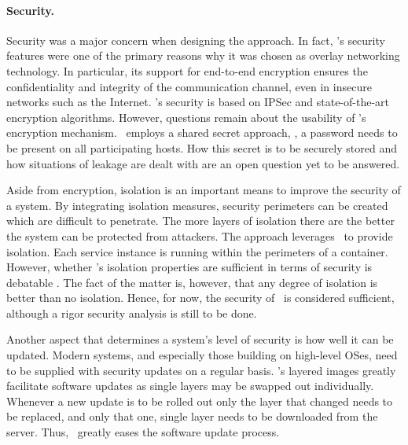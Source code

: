\paragraph{Security.}
Security was a major concern when designing the approach. In fact, \weave 's security features were one of the primary reasons why it was chosen as overlay networking technology. In particular, its support for end-to-end encryption ensures the confidentiality and integrity of the communication channel, even in insecure networks such as the Internet. \wnet 's security is based on IPSec and state-of-the-art encryption algorithms. However, questions remain about the usability of \weave 's encryption mechanism. \weave\ employs a shared secret approach, \ie , a password needs to be present on all participating hosts. How this secret is to be securely stored and how situations of leakage are dealt with are an open question yet to be answered.

Aside from encryption, isolation is an important means to improve the security of a system. By integrating isolation measures, security perimeters can be created which are difficult to penetrate. The more layers of isolation there are the better the system can be protected from attackers. The approach leverages \docker\ to provide isolation. Each service instance is running within the perimeters of a container. However, whether \docker 's isolation properties are sufficient in terms of security is debatable \cite{xavier2013performance}. The fact of the matter is, however, that any degree of isolation is better than no isolation. Hence, for now, the security of \docker\ is considered sufficient, although a rigor security analysis is still to be done.

Another aspect that determines a system's level of security is how well it can be updated. Modern systems, and especially those building on high-level OSes, need to be supplied with security updates on a regular basis. \docker 's layered images greatly facilitate software updates as single layers may be swapped out individually. Whenever a new update is to be rolled out only the layer that changed needs to be replaced, and only that one, single layer needs to be downloaded from the server. Thus, \docker\ greatly eases the software update process.


